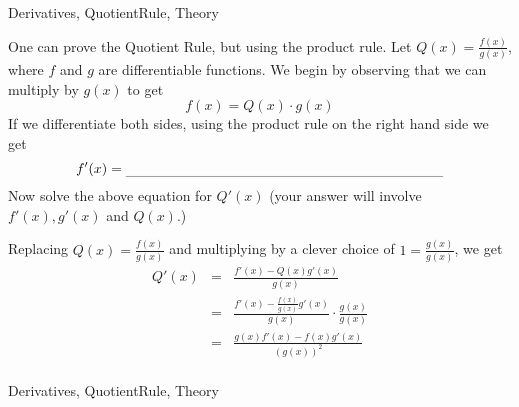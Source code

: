 \begin{tagblock}{Derivatives, QuotientRule, Theory}
\begin{question}
	
One can prove the Quotient Rule, but using the product rule.  Let $\displaystyle Q(x) = \frac{f(x)}{g(x)}$, where $f$ and $g$ are differentiable functions.   We begin by observing that we can multiply by $g(x)$ to get
\[ f(x) = Q(x) \cdot g(x) \]
If we differentiate  both sides, using the product rule on the right hand side we get
\[ f'(x) =   \rule[-0.1cm]{8cm}{0.01cm} \] 
Now solve the above equation for $Q'(x)$ (your answer will involve $f'(x), g'(x)$ and $Q(x)$.)

\vspace{1.5in}
Replacing $\displaystyle Q(x) = \frac{f(x)}{g(x)}$ and multiplying by a clever choice of $\displaystyle 1 = \frac{g(x)}{g(x)}$, we get
\begin{eqnarray*}
Q'(x) &=& \frac{f'(x)-Q(x)g'(x)}{g(x)}\\
&=&  \frac{f'(x)-\frac{f(x)}{g(x)}g'(x)}{g(x)} \cdot \frac{g(x)}{g(x)} \\
&=&  \frac{g(x)f'(x)-f(x)g'(x)}{(g(x))^2}  \\
\end{eqnarray*}
















	










	
	
\begin{tags}
	    Derivatives, QuotientRule, Theory
\end{tags}
	
\begin{diary}
\end{diary}
	
\begin{solution}
	   
\end{solution}
	
\end{question}

\end{tagblock}

